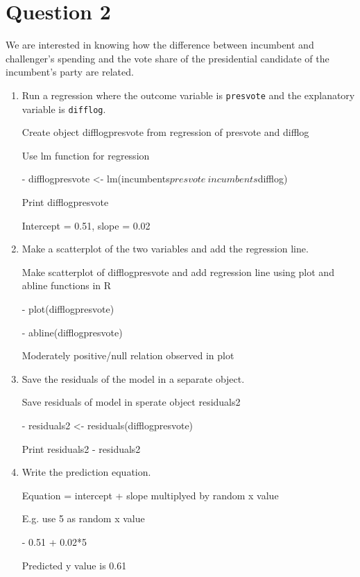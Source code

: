 \documentclass[12pt,letterpaper]{article}
\begin{document}
\newpage

\section*{Question 2}%
\noindent We are interested in knowing how the difference between incumbent and challenger's spending and the vote share of the presidential candidate of the incumbent's party are related.	\vspace{.25cm}
	\begin{enumerate}
		\item Run a regression where the outcome variable is \texttt{presvote} and the explanatory variable is \texttt{difflog}.	\vspace{5cm}
		
		Create object difflogpresvote from regression of presvote and difflog
		
		Use lm function for regression
		
	-	difflogpresvote <- lm(incumbents$presvote ~ incumbents$difflog)
		
	Print difflogpresvote 
	 
	 Intercept = 0.51, slope = 0.02
	
		\item Make a scatterplot of the two variables and add the regression line. 	\vspace{5cm}
		
		Make scatterplot of difflogpresvote and add regression line using plot and abline functions in R
		
	-	plot(difflogpresvote)
	
	-	abline(difflogpresvote)
		
		Moderately positive/null relation observed in plot
		
		\item Save the residuals of the model in a separate object.	\vspace{5cm}
		
		 Save residuals of model in sperate object residuals2
				
	- 	residuals2 <- residuals(difflogpresvote)
	
		Print residuals2
		- residuals2
		\item Write the prediction equation.
	
	Equation = intercept + slope multiplyed by random x value
	
	E.g. use 5 as random x value
	
	-	0.51 + 0.02*5
	
	Predicted y value is 0.61
	\end{enumerate}
	
\end{document}
